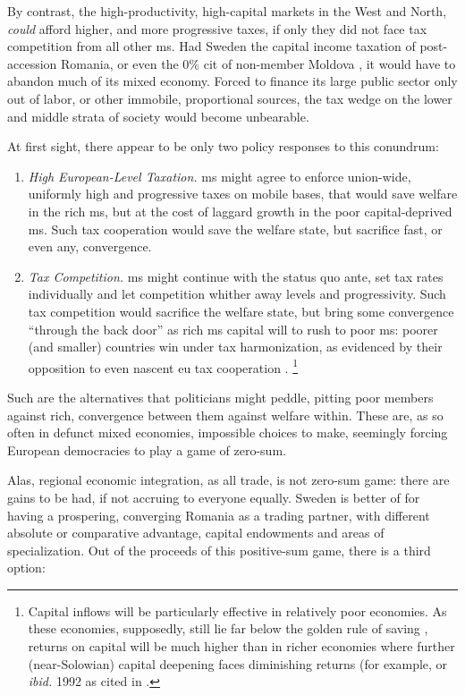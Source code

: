 By contrast, the high-productivity, high-capital markets in the West and North, \emph{could} afford higher, and more progressive taxes, if only they did not face tax competition from all other \gls{ms}.
Had Sweden the capital income taxation of post-accession Romania, or even the 0\% \gls{cit} of non-member Moldova \citep{Piatkowski2008}, it would have to abandon much of its mixed economy.
Forced to finance its large public sector only out of labor, or other immobile, proportional sources, the tax wedge on the lower and middle strata of society would become unbearable.

At first sight, there appear to be only two policy responses to this conundrum:
\begin{enumerate}
	\item \emph{High European-Level Taxation.}
	\gls{ms} might agree to enforce union-wide, uniformly high and progressive taxes on mobile bases, that would save welfare in the rich \gls{ms}, but at the cost of laggard growth in the poor capital-deprived \gls{ms}.
	Such tax cooperation would save the welfare state, but sacrifice fast, or even any, convergence.

	\item \emph{Tax Competition.}
	\gls{ms} might continue with the status quo ante, set tax rates individually and let competition whither away levels and progressivity.
	Such tax competition would sacrifice the welfare state, but bring some convergence ``through the back door'' as rich \gls{ms} capital will to rush to poor \gls{ms}:
	poorer (and smaller) countries win under tax harmonization, as evidenced by their opposition to even nascent \gls{eu} tax cooperation \citep[138]{Kellermann2009}.
	\footnote{
		Capital inflows will be particularly effective in relatively poor economies.
		As these economies, supposedly, still lie far below the golden rule of saving \citep{Solow1956}, returns on capital will be much higher than in richer economies where further (near-Solowian) capital deepening faces diminishing returns (for example, \citealt{Barro1995} or \emph{ibid.} 1992 as cited in \cite[3]{Beckfield2009}.
	}
\end{enumerate}

Such are the alternatives that politicians might peddle, pitting poor members against rich, convergence between them against welfare within.
These are, as so often in defunct mixed economies, impossible choices to make, seemingly forcing European democracies to play a game of zero-sum.

Alas, regional economic integration, as all trade, is not zero-sum game:
there are gains to be had, if not accruing to everyone equally.
Sweden is better of for having a prospering, converging Romania as a trading partner, with different absolute or comparative advantage, capital endowments and areas of specialization.
Out of the proceeds of this positive-sum game, there is a third option:

